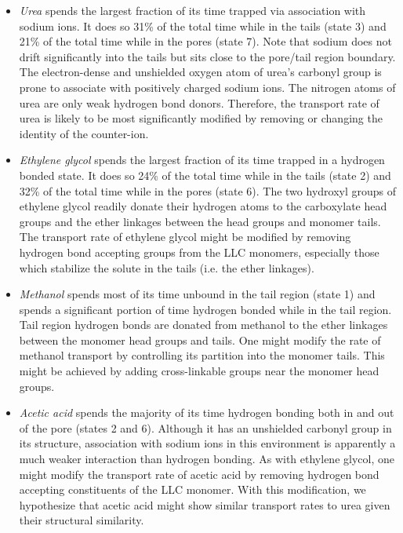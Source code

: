 \documentclass[journal=jctcce,manuscript=article]{achemso}
\begin{document}
  \begin{itemize}
  \item \textit{Urea} spends the largest fraction of its time trapped via association with
  sodium ions. It does so 31\% of the total time while in the tails (state 3)
  and 21\% of the total time while in the pores (state 7). Note that sodium
  does not drift significantly into the tails but sits close to the pore/tail
  region boundary. The electron-dense and unshielded oxygen atom of urea's
  carbonyl group is prone to associate with positively charged sodium ions. The
  nitrogen atoms of urea are only weak hydrogen bond donors. Therefore, the
  transport rate of urea is likely to be most significantly modified by
  removing or changing the identity of the counter-ion.
  
  \item \textit{Ethylene glycol} spends the largest fraction of its time trapped in a hydrogen
  bonded state. It does so 24\% of the total time while in the tails (state 2)
  and 32\% of the total time while in the pores (state 6). The two hydroxyl
  groups of ethylene glycol readily donate their hydrogen atoms to the
  carboxylate head groups and the ether linkages between the head groups and
  monomer tails. The transport rate of ethylene glycol might be modified by
  removing hydrogen bond accepting groups from the LLC monomers, especially
  those which stabilize the solute in the tails (i.e. the ether linkages). 
  
  \item \textit{Methanol} spends most of its time unbound in the tail region (state 1) and
  spends a significant portion of time hydrogen bonded while in the tail
  region. Tail region hydrogen bonds are donated from methanol to the ether
  linkages between the monomer head groups and tails. One might modify the
  rate of methanol transport by controlling its partition into the monomer
  tails. This might be achieved by adding cross-linkable groups near the
  monomer head groups.
  
  \item \textit{Acetic acid} spends the majority of its time hydrogen bonding both in
  and out of the pore (states 2 and 6). Although it has an unshielded carbonyl
  group in its structure, association with sodium ions in this environment is
  apparently a much weaker interaction than hydrogen bonding.  As with ethylene
  glycol, one might modify the transport rate of acetic acid by removing
  hydrogen bond accepting constituents of the LLC monomer. With this
  modification, we hypothesize that acetic acid might show similar transport
  rates to urea given their structural similarity.
  \end{itemize}
  
\end{document}
